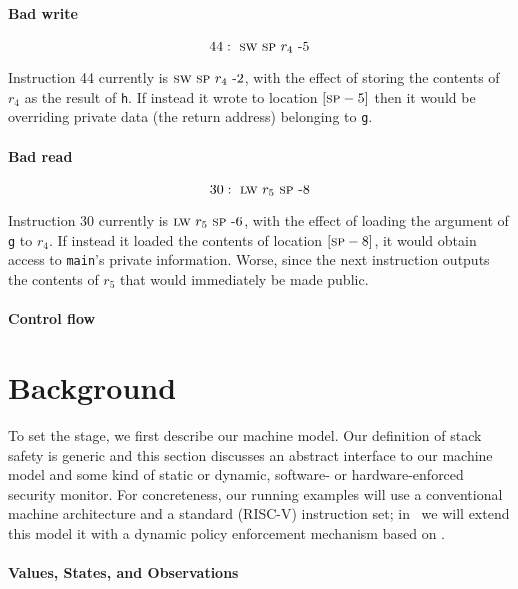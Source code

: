 \documentclass[acmsmall,review,anonymous]{acmart}\settopmatter{printfolios=true,printccs=false,printacmref=false}
\begin{document}
\paragraph*{Bad write}

\[
44 : ~ \textsc{sw} ~ \textsc{sp} ~ r_4 ~ \textrm{-} 5
\]

Instruction 44 currently is $\textsc{sw} ~ \textsc{sp} ~ r_4 ~ \textrm{-} 2$, with the
effect of storing the contents of $r_4$ as the result of {\tt h}. If
instead it wrote to location $[\textsc{sp} - 5]$ then it would be overriding
private data (the return address) belonging to {\tt g}.

\paragraph*{Bad read}

\[
30 : ~ \textsc{lw} ~ r_5 ~ \textsc{sp} ~ \textrm{-} 8
\]

Instruction 30 currently is $\textsc{lw} ~ r_5 ~ \textsc{sp} ~ \textrm{-} 6$, with the
effect of loading the argument of {\tt g} to $r_4$. If instead it
loaded the contents of location $[\textsc{sp} - 8]$, it would obtain access
to {\tt main}'s private information. Worse, since the next instruction
outputs the contents of $r_5$ that would immediately be made public.

\paragraph*{Control flow}


\section{Background}
\label{sec:prelim}

To set the stage, we first describe our machine model. Our definition
of stack safety is generic and this section discusses an abstract
interface to our machine model and some kind of static or dynamic,
software- or hardware-enforced security monitor.  For concreteness,
our running examples will use a conventional machine architecture and
a standard (RISC-V) instruction set; in~ we
will extend this model it with a dynamic policy enforcement mechanism
based on .

\paragraph*{Values, States, and Observations}
\end{document}
